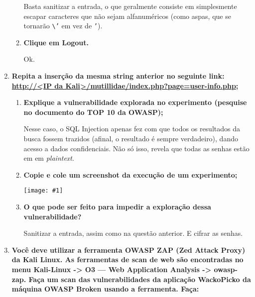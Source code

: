 \documentclass{article}
\newcommand{\code}[1]{\texttt{#1}}
\newcommand{\img}[1]{%
    \texttt{[image: \#1]}
}
\begin{document}
\begin{enumerate}
\begin{enumerate}
                    Basta sanitizar a entrada, o que geralmente consiste em
                    simplesmente escapar caracteres que não sejam alfanuméricos
                    (como aspas, que se tornarão \code{\textbackslash'} em vez
                    de \code{'}).

                \item \textbf{Clique em Logout.}

                    Ok.

            \end{enumerate}
        \item \textbf{Repita a inserção da mesma string anterior no seguinte
                link: \url{http://<IP da
            Kali>/mutillidae/index.php?page=user-info.php};}
            \begin{enumerate}
                \item \textbf{Explique a vulnerabilidade explorada no
                    experimento (pesquise no documento do TOP 10 da OWASP);}

                    Nesse caso, o SQL Injection apenas fez com que todos os
                    resultados da busca fossem trazidos (afinal, o resultado é
                    sempre verdadeiro), dando acesso a dados confidenciais. Não
                    só isso, revela que todas as senhas estão em em
                    \textit{plaintext}.

                \item \textbf{Copie e cole um screenshot da execução de um
                    experimento;}

                    \img{imgs/q2_3}

                \item \textbf{O que pode ser feito para impedir a exploração
                    dessa vulnerabilidade?}

                    Sanitizar a entrada, assim como na questão anterior. E
                    cifrar as senhas.
            \end{enumerate}
        \item \textbf{Você deve utilizar a ferramenta OWASP ZAP (Zed Attack
                Proxy) da Kali Linux. As ferramentas de scan de web são
                encontradas no menu Kali-Linux -> O3 --- Web Application
                Analysis -> owasp-zap. Faça um scan das vulnerabilidades da
                aplicação WackoPicko da máquina OWASP Broken usando a
            ferramenta. Faça:}


\end{enumerate}
\end{document}
